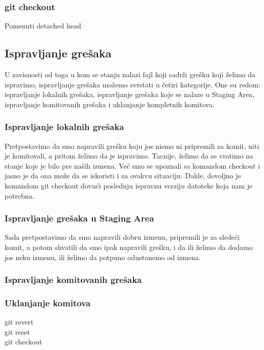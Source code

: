 \documentclass[a4paper]{article}
\begin{document}
{\subsubsection{git checkout}
\label{checkout}

Pomenuti detached head

\subsection{Ispravljanje grešaka}
\label{subsec:greske}

U zavisnosti od toga u kom se stanju nalazi fajl koji sadrži grešku koji želimo da ispravimo, ispravljanje grešaka možemo svrstati u četiri kategorije. One su redom: ispravljanje lokalnih grešaka, ispravljanje grešaka koje se nalaze u Staging Area, ispravljanje komitovanih grešaka i uklanjanje kompletnih komitova.

\subsubsection*{Ispravljanje lokalnih grešaka}
\label{lokalne_greske}
Pretpostavimo da smo napravili grešku koju jos nismo ni pripremili za komit, niti je komitovali, a pritom želimo da je ispravimo. Tacnije, želimo da se vratimo na stanje koje je bilo pre naših izmena. Već smo se upoznali sa komandom checkout i jasno je da ona može da se iskoristi i za ovakvu situaciju. Dakle, dovoljno je komandom git checkout dovući poslednju ispravnu verziju datoteke koja nam je potrebna.

\subsubsection*{Ispravljanje grešaka u Staging Area}
\label{staging_greske}

Sada pretpostavimo da smo napravili dobru izmenu, pripremili je za sledeći komit, a potom shvatili da smo ipak napravili grešku, i da ili želimo da dodamo jos neku izmenu, ili želimo da potpuno odustanemo od izmena.
\subsubsection*{Ispravljanje komitovanih grešaka}
\label{komitovane_greske}
\subsubsection*{Uklanjanje komitova}
\label{uklanjanje_komitova}
git revert \\
git reset \\
git checkout \\

}
\end{document}
